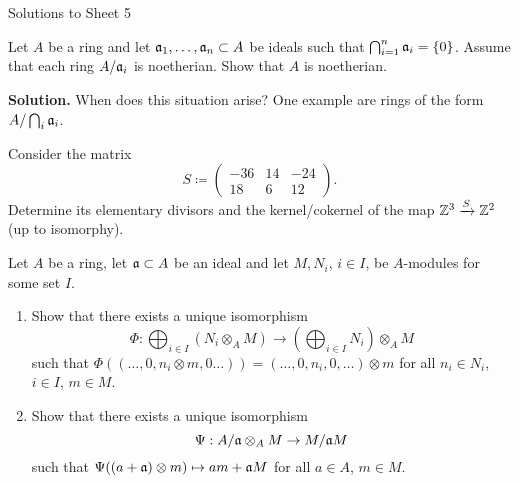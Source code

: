 \documentclass[a4paper,11pt]{article}
\begin{document}
\begin{center}
    \huge{Solutions to Sheet 5}
\end{center}

Let $A$ be a ring and let $\mathfrak{a}_1, \dots, \mathfrak{a}_n \subset A$ be ideals such
that $\bigcap_{i=1}^n \mathfrak{a}_i = \{0\}$. Assume that each ring 
$A / \mathfrak{a}_i$ is noetherian. Show that $A$ is noetherian. 

\textbf{Solution.}
When does this situation arise? One example are rings of the form
$A / \bigcap_i \mathfrak{a}_i$. 


Consider the matrix
\begin{equation*}
    S \coloneqq \begin{pmatrix}
        -36 & 14 & -24 \\
        18 & 6 & 12
    \end{pmatrix}.
\end{equation*}
Determine its elementary divisors and the kernel/cokernel of the map
$\mathbb{Z}^3 \xrightarrow{S} \mathbb{Z}^2$ (up to isomorphy).

Let $A$ be a ring, let $\mathfrak{a} \subset A$ be an ideal and let $M, N_i$, $i \in I$, be $A$-modules for some set $I$. 
\begin{enumerate}
    \item Show that there exists a unique isomorphism
        \begin{equation*}
            \Phi: \bigoplus_{i \in I} (N_i \otimes_A M) \to \left( \bigoplus_{i
                \in I} N_i \right ) \otimes_A M
        \end{equation*}
        such that $\Phi((\dots,0, n_i \otimes m, 0 \dots)) = (\dots, 0, n_i, 0,\dots) \otimes m$ for all $n_i \in N_i$, $i \in I$, $m \in M$. 
    \item Show that there exists a unique isomorphism
        \begin{equation*}
            \Psi: A / \mathfrak{a} \otimes_A M \to M/\mathfrak{a} M
        \end{equation*}
        such that $\Psi((a + \mathfrak{a}) \otimes m) \mapsto am + \mathfrak{a} M$ for all 
        $a \in A$, $m \in M$. 
\end{enumerate}
\end{document}
